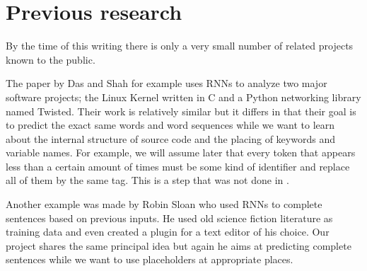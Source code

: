 \section{Previous research}

    By the time of this writing there is only a very small number of related projects known to the public.

    The paper by Das and Shah \cite{cococo} for example uses RNNs to analyze two major software projects;
    the Linux Kernel written in C and a Python networking library named Twisted. Their work is relatively
    similar but it differs in that their goal is to predict the exact same words and word sequences
    while we want to learn about the internal structure of source code and the placing of keywords
    and variable names. For example, we will assume later that every token that appears less than
    a certain amount of times must be some kind of identifier and replace all of them by the same
    tag. This is a step that was not done in \cite{cococo}.

    Another example was made by Robin Sloan \cite{writing} who used RNNs to complete sentences
    based on previous inputs. He used old science fiction literature as training data
    and even created a plugin for a text editor of his choice. Our project shares the same
    principal idea but again he aims at predicting complete sentences while we want to
    use placeholders at appropriate places.
